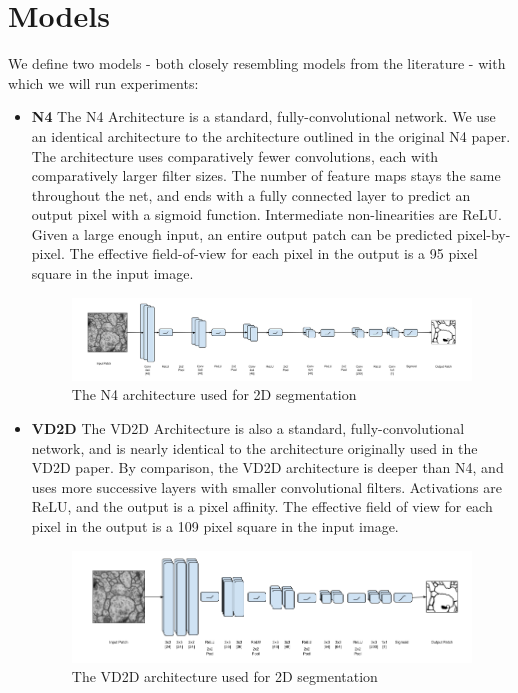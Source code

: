 \section{Models}

We define two models - both closely resembling models from the literature -  with which we will run experiments:

\begin{itemize}
\item \textbf{N4} The N4 Architecture is a standard, fully-convolutional network. We use an identical architecture to the architecture outlined in the original N4 paper\cite{Cirean}. The architecture uses comparatively fewer convolutions, each with comparatively larger filter sizes. The number of feature maps stays the same throughout the net, and ends with a fully connected layer to predict an output pixel with a sigmoid function. Intermediate non-linearities are ReLU. Given a large enough input, an entire output patch can be predicted pixel-by-pixel. The effective field-of-view for each pixel in the output is a 95 pixel square in the input image.

\begin{figure}[h]
\centering
\includegraphics[width=\textwidth]{img/N4.png}
\caption{The N4 architecture used for 2D segmentation}
\label{fig:n4}
\end{figure}

\item \textbf{VD2D} The VD2D Architecture is also a standard, fully-convolutional network, and is nearly identical to the architecture originally used in the VD2D paper\cite{Lee}. By comparison, the VD2D architecture is deeper than N4, and uses more successive layers with smaller convolutional filters. Activations are ReLU, and the output is a pixel affinity. The effective field of view for each pixel in the output is a 109 pixel square in the input image.

\begin{figure}[h]
\centering
\includegraphics[width=\textwidth]{img/VD2D.png}
\caption{The VD2D architecture used for 2D segmentation}
\label{fig:vd2d}
\end{figure}

\end{itemize}

